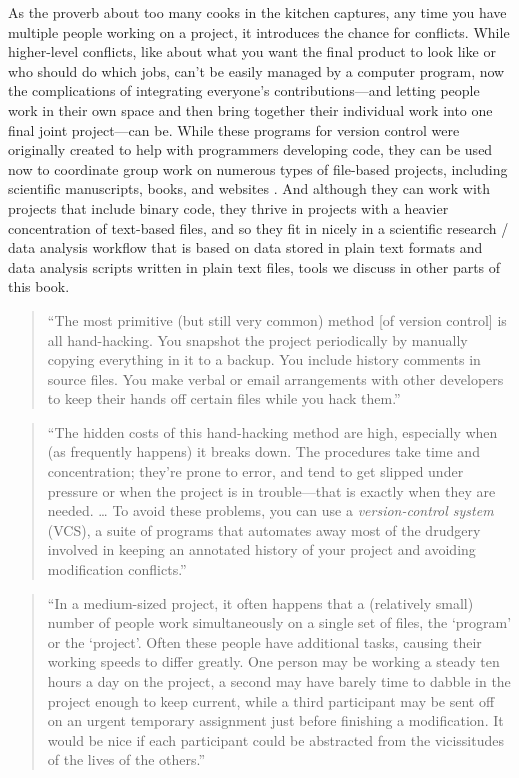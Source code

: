 \documentclass[]{tufte-book}
\begin{document}
As the proverb about too many cooks in the kitchen captures, any time you have
multiple people working on a project, it introduces the chance for conflicts.
While higher-level conflicts, like about what you want the final product to look
like or who should do which jobs, can't be easily managed by a computer program,
now the complications of integrating everyone's contributions---and letting
people work in their own space and then bring together their individual work
into one final joint project---can be. While these programs for version control
were originally created to help with programmers developing code, they can be
used now to coordinate group work on numerous types of file-based projects,
including scientific manuscripts, books, and websites \citep{raymondunderstanding}.
And although they can work with projects that include binary code, they thrive
in projects with a heavier concentration of text-based files, and so they fit in
nicely in a scientific research / data analysis workflow that is based on data
stored in plain text formats and data analysis scripts written in plain text
files, tools we discuss in other parts of this book.

\begin{quote}
``The most primitive (but still very common) method {[}of version control{]} is all
hand-hacking. You snapshot the project periodically by manually copying everything
in it to a backup. You include history comments in source files. You make verbal
or email arrangements with other developers to keep their hands off certain files
while you hack them.'' \citep{raymond2003art}
\end{quote}

\begin{quote}
``The hidden costs of this hand-hacking method are high, especially when (as
frequently happens) it breaks down. The procedures take time and concentration;
they're prone to error, and tend to get slipped under pressure or when the project
is in trouble---that is exactly when they are needed. \ldots{} To avoid these problems,
you can use a \emph{version-control system} (VCS), a suite of programs that
automates away most of the drudgery involved in keeping an annotated history of
your project and avoiding modification conflicts.'' \citep{raymond2003art}
\end{quote}

\begin{quote}
``In a medium-sized project, it often happens that a (relatively small) number
of people work simultaneously on a single set of files, the `program' or the
`project'. Often these people have additional tasks, causing their working
speeds to differ greatly. One person may be working a steady ten hours a day on
the project, a second may have barely time to dabble in the project enough to
keep current, while a third participant may be sent off on an urgent temporary
assignment just before finishing a modification. It would be nice if each
participant could be abstracted from the vicissitudes of the lives of the
others.'' \citep{grune1986concurrent}
\end{quote}
\end{document}
